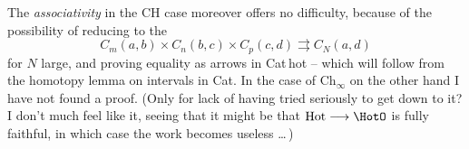 The \textit{associativity} in the CH case moreover offers no difficulty, because of the possibility of reducing to the
\[
C_m(a,b)\times C_n(b,c)\times C_p(c,d)\rightrightarrows C_N(a,d)
\]
for $N$ large, and proving equality as arrows in Cat\,hot -- which will follow from the homotopy lemma %
on intervals in Cat. In the case of $\mathrm{Ch}_{\infty}$ on the other hand I have not found a proof. (Only for lack of having tried seriously to get down to it? I don't much feel like it, seeing that it might be that $\mathrm{Hot}\longrightarrow\HotO$ is fully faithful, in which case the work becomes useless \dots\,)